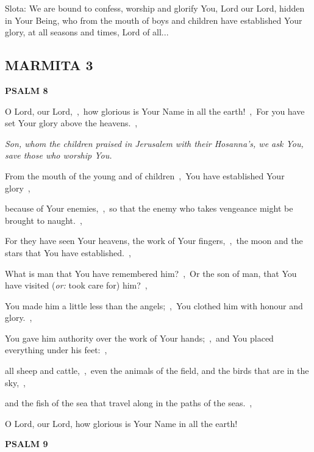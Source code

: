\documentclass[12pt,twoside,a5paper]{article}
\newcommand{\marmita}[1]{\subsection*{MARMITA {#1}}}
\newcommand{\psalm}[1]{\textbf{PSALM {#1}}\nopagebreak}
\newcommand{\qanona}[1]{{\liturgicalhint{Qanona.} \emph{#1}}}
\newcommand{\slota}[1]{\liturgicalhint{Slota.} #1}
\newcommand{\translationoption}[1]{\emph{or:} #1}
\begin{document}
\slota{Slota: We are bound to confess, worship and glorify You, Lord our Lord, hidden in Your Being, who from the mouth of boys and children have established Your glory, at all seasons and times, Lord of all...}

\marmita{3}

\psalm{8}

\begin{normalparskip}
  O Lord, our Lord,~\sep\ how glorious is Your Name in all the earth!~\sep\ For you have set Your glory above the heavens.~\sep

  \qanona{Son, whom the children praised in Jerusalem with their Hosanna's, we ask You, save those who worship You.}

  From the mouth of the young and of children~\sep\ You have established Your glory~\sep

  because of Your enemies,~\sep\ so that the enemy who takes vengeance might be brought to naught.~\sep

  For they have seen Your heavens, the work of Your fingers,~\sep\ the moon and the stars that You have established.~\sep

  What is man that You have remembered him?~\sep\ Or the son of man, that You have visited (\translationoption{took care for}) him?~\sep

  You made him a little less than the angels;~\sep\ You clothed him with honour and glory.~\sep

  You gave him authority over the work of Your hands;~\sep\ and You placed everything under his feet:~\sep

  all sheep and cattle,~\sep\ even the animals of the field, and the birds that are in the sky,~\sep

  and the fish of the sea that travel along in the paths of the seas.~\sep

  O Lord, our Lord, how glorious is Your Name in all the earth!
\end{normalparskip}

\psalm{9}
\end{document}
